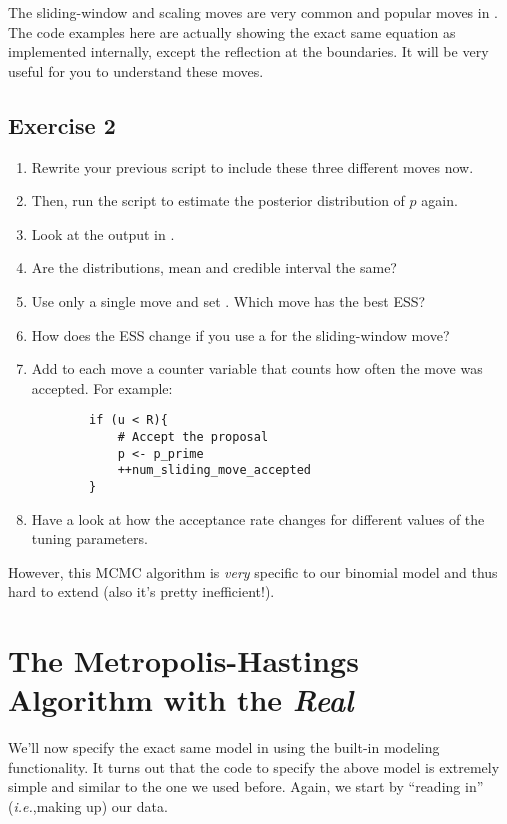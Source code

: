 \begin{framed}
The sliding-window and scaling moves are very common and popular moves in \RevBayes.
The code examples here are actually showing the exact same equation as implemented internally, except the reflection at the boundaries.
It will be very useful for you to understand these moves.	
\end{framed}




\subsection{Exercise 2}

\begin{enumerate}[label=\textnormal{Step \arabic*)}]
	\item Rewrite your previous script to include these three different moves now.
	\item Then, run the script to estimate the posterior distribution of $p$ again.
	\item Look at the output in \Tracer.
	\item Are the distributions, mean and credible interval the same?
	\item Use only a single move and set . Which move has the best ESS?
	\item How does the ESS change if you use a  for the sliding-window move?
	\item Add to each move a counter variable that counts how often the move was accepted. For example:
{\tt \begin{snugshade*}
\begin{lstlisting}    
        if (u < R){
            # Accept the proposal
            p <- p_prime
            ++num_sliding_move_accepted
        } \end{lstlisting}
\end{snugshade*}}
	\item Have a look at how the acceptance rate changes for different values of the tuning parameters.
\end{enumerate}


However, this MCMC algorithm is \emph{very} specific to our binomial model and thus hard to extend (also it's pretty inefficient!).


\section{The Metropolis-Hastings Algorithm with the \emph{Real} \RevBayes}
We'll now specify the exact same model in \Rev using the built-in modeling functionality.
It turns out that the \Rev code to specify the above model is extremely simple and similar to the one we used before.
Again, we start by ``reading in'' (\emph{i.e.},making up) our data.

